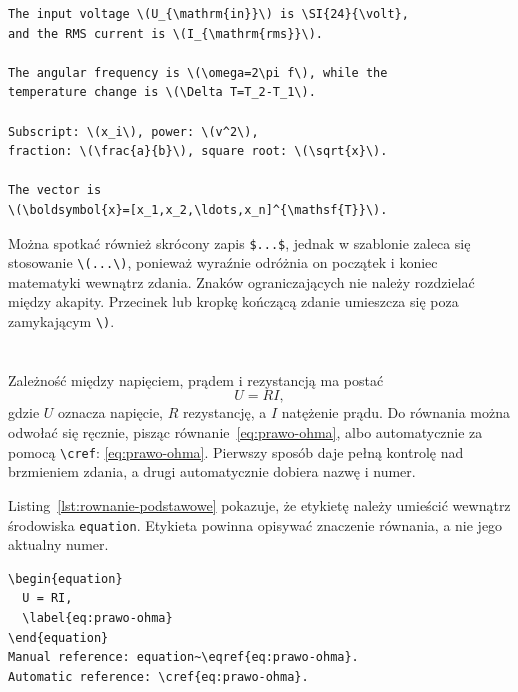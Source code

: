 \begin{lstlisting}[style=thesis,caption={Wstawianie matematyki i symboli wewnątrz zdania},label={lst:matematyka-w-zdaniu}]
The input voltage \(U_{\mathrm{in}}\) is \SI{24}{\volt},
and the RMS current is \(I_{\mathrm{rms}}\).

The angular frequency is \(\omega=2\pi f\), while the
temperature change is \(\Delta T=T_2-T_1\).

Subscript: \(x_i\), power: \(v^2\),
fraction: \(\frac{a}{b}\), square root: \(\sqrt{x}\).

The vector is
\(\boldsymbol{x}=[x_1,x_2,\ldots,x_n]^{\mathsf{T}}\).
\end{lstlisting}

Można spotkać również skrócony zapis \verb|$...$|, jednak w szablonie zaleca się
stosowanie \verb|\(...\)|, ponieważ wyraźnie odróżnia on początek i koniec matematyki
wewnątrz zdania. Znaków ograniczających nie należy rozdzielać między akapity. Przecinek
lub kropkę kończącą zdanie umieszcza się poza zamykającym \verb|\)|.

\section{}

Zależność między napięciem, prądem i rezystancją ma postać
\begin{equation}
  U = RI,
  \label{eq:prawo-ohma}
\end{equation}
gdzie $U$ oznacza napięcie, $R$ rezystancję, a $I$ natężenie prądu.
Do równania można odwołać się ręcznie, pisząc równanie~\eqref{eq:prawo-ohma}, albo
automatycznie za pomocą \verb|\cref|: \cref{eq:prawo-ohma}. Pierwszy sposób daje
pełną kontrolę nad brzmieniem zdania, a drugi automatycznie dobiera nazwę i numer.

Listing~\ref{lst:rownanie-podstawowe} pokazuje, że etykietę należy umieścić wewnątrz
środowiska \texttt{equation}. Etykieta powinna opisywać znaczenie równania, a nie jego
aktualny numer.

\begin{lstlisting}[style=thesis,caption={Kod pojedynczego równania i odwołań},label={lst:rownanie-podstawowe}]
\begin{equation}
  U = RI,
  \label{eq:prawo-ohma}
\end{equation}
Manual reference: equation~\eqref{eq:prawo-ohma}.
Automatic reference: \cref{eq:prawo-ohma}.
\end{lstlisting}

